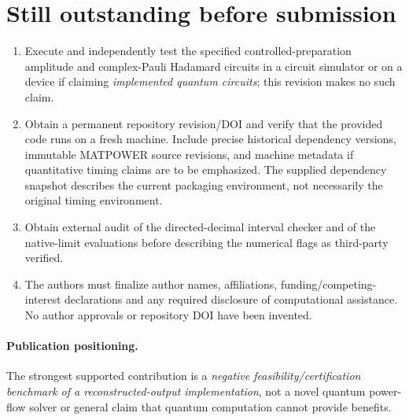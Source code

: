 \documentclass[11pt,a4paper]{article}
\begin{document}
\section*{Still outstanding before submission}
\begin{enumerate}
\item Execute and independently test the specified controlled-preparation amplitude and complex-Pauli Hadamard circuits in a circuit simulator or on a device if claiming \emph{implemented quantum circuits}; this revision makes no such claim.
\item Obtain a permanent repository revision/DOI and verify that the provided code runs on a fresh machine. Include precise historical dependency versions, immutable MATPOWER source revisions, and machine metadata if quantitative timing claims are to be emphasized. The supplied dependency snapshot describes the current packaging environment, not necessarily the original timing environment.
\item Obtain external audit of the directed-decimal interval checker and of the native-limit evaluations before describing the numerical flags as third-party verified.
\item The authors must finalize author names, affiliations, funding/competing-interest declarations and any required disclosure of computational assistance. No author approvals or repository DOI have been invented.
\end{enumerate}
\paragraph{Publication positioning.} The strongest supported contribution is a \emph{negative feasibility/certification benchmark of a reconstructed-output implementation}, not a novel quantum power-flow solver or general claim that quantum computation cannot provide benefits.
\end{document}
